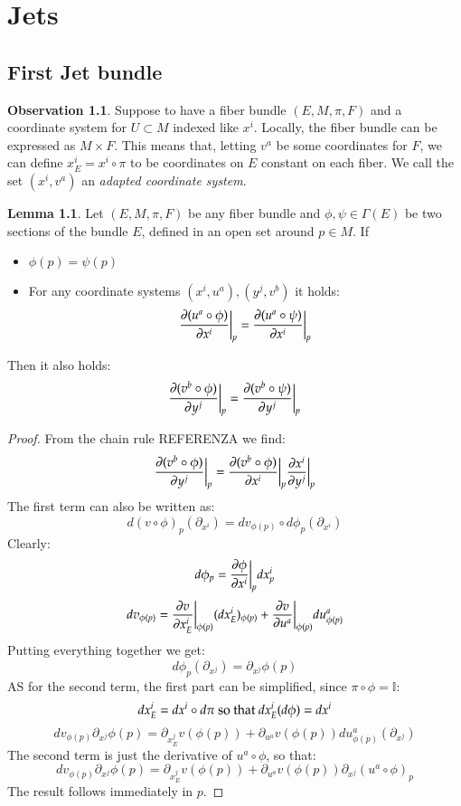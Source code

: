 \documentclass[12pt,a4paper]{report}
\theoremstyle{definition}
\theoremstyle{Theorem}
\newtheorem{Lm}[Def]{Lemma}
\theoremstyle{break}
\theoremstyle{definition}
\newtheorem{Obs}[Def]{Observation}
\begin{document}
	\chapter{Jets}
	\section{First Jet bundle}
	\begin{Obs}
		Suppose to have a fiber bundle $(E,M,\pi,F)$ and a coordinate system for $U\subset M$ indexed like $x^i$. Locally, the fiber bundle can be expressed as $M\times F$. This means that, letting $v^a$ be some coordinates for $F$, we can define $x_E^i=x^i \circ \pi$ to be coordinates on $E$ constant on each fiber. We call the set $(x^i,v^a)$ an \textit{adapted coordinate system}.
	\end{Obs}
	\begin{Lm}
		Let $(E,M,\pi,F)$ be any fiber bundle and $\phi,\psi\in\Gamma(E)$ be two sections of the bundle $E$, defined in an open set around $p\in M$. If
		\begin{itemize}
			\item $\phi(p)=\psi(p)$ 
			\item For any coordinate systems $(x^i,u^a),(y^j,v^b)$ it holds:
			$${\partial(u^a\circ\phi) \over \partial{x^i}}\bigg|_p={\partial(u^a\circ\psi) \over \partial{x^i}}\bigg|_p$$
		\end{itemize} 
		Then it also holds:
		$${\partial(v^b\circ\phi) \over \partial{y^j}}\bigg|_p={\partial(v^b\circ\psi) \over \partial{y^j}}\bigg|_p$$
	\end{Lm}
	\begin{proof}
		From the chain rule REFERENZA we find:
		$${\partial(v^b\circ\phi) \over \partial{y^j}}\bigg|_p={\partial(v^b\circ\phi) \over \partial{x^i}}\bigg|_p{\partial x^i \over \partial{y^j}}\bigg|_p$$
		The first term can also be written as:
		$$d(v\circ \phi)_p(\partial_{x^i})=dv_{\phi(p)}\circ d\phi_p(\partial_{x^i})$$
		Clearly:
		$$d\phi_p={\partial \phi\over \partial{x^i}}\bigg|_p dx^i_p$$
		$$dv_{\phi(p)}={\partial v\over  \partial{x^i_E}}\bigg|_{\phi(p)} (dx^i_E)_{\phi(p)}+{\partial v\over \partial u^a}\bigg|_{\phi(p)} du^a_{\phi(p)}$$
		Putting everything together we get:
		$$d\phi_p(\partial_{x^j})=\partial_{x^j}\phi(p)$$
		AS for the second term, the first part can be simplified, since $\pi\circ \phi=\mathbb{I}$:
		$$dx^i_E=dx^i\circ d\pi\hbox{ so that }dx^i_E(d\phi)=dx^i$$
		$$dv_{\phi(p)}\partial_{x^j}\phi(p)=\partial_{x^j_E}v(\phi(p))+\partial_{u^a}v(\phi(p)) du^a_{\phi(p)}(\partial_{x^j})$$
		The second term is just the derivative of $u^a\circ \phi$, so that:
		$$dv_{\phi(p)}\partial_{x^j}\phi(p)=\partial_{x^j_E}v(\phi(p))+\partial_{u^a}v(\phi(p)) \partial_{x^j}(u^a\circ \phi)_p$$
		The result follows immediately in $p$.
	\end{proof}
\end{document}
